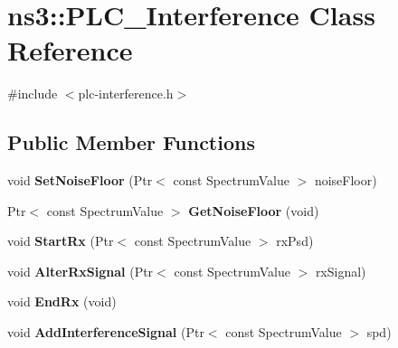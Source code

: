 \hypertarget{classns3_1_1PLC__Interference}{\section{ns3\-:\-:\-P\-L\-C\-\_\-\-Interference \-Class \-Reference}
\label{classns3_1_1PLC__Interference}
}


{\ttfamily \#include $<$plc-\/interference.\-h$>$}

\subsection*{\-Public \-Member \-Functions}
\begin{DoxyCompactItemize}
\item 
\hypertarget{classns3_1_1PLC__Interference_a627130812a35d6a0457c29886ab3aa65}{void {\bfseries \-Set\-Noise\-Floor} (\-Ptr$<$ const \-Spectrum\-Value $>$ noise\-Floor)}\label{classns3_1_1PLC__Interference_a627130812a35d6a0457c29886ab3aa65}

\item 
\hypertarget{classns3_1_1PLC__Interference_a4677a5ae77a5f51bcef95191c8a9e727}{\-Ptr$<$ const \-Spectrum\-Value $>$ {\bfseries \-Get\-Noise\-Floor} (void)}\label{classns3_1_1PLC__Interference_a4677a5ae77a5f51bcef95191c8a9e727}

\item 
\hypertarget{classns3_1_1PLC__Interference_a18b6be996768760513b0ee2e29710016}{void {\bfseries \-Start\-Rx} (\-Ptr$<$ const \-Spectrum\-Value $>$ rx\-Psd)}\label{classns3_1_1PLC__Interference_a18b6be996768760513b0ee2e29710016}

\item 
\hypertarget{classns3_1_1PLC__Interference_a4c8ea84010d1f097253693b0d9e35291}{void {\bfseries \-Alter\-Rx\-Signal} (\-Ptr$<$ const \-Spectrum\-Value $>$ rx\-Signal)}\label{classns3_1_1PLC__Interference_a4c8ea84010d1f097253693b0d9e35291}

\item 
\hypertarget{classns3_1_1PLC__Interference_a5b733c2fb32b0dc58938643a9adb9a41}{void {\bfseries \-End\-Rx} (void)}\label{classns3_1_1PLC__Interference_a5b733c2fb32b0dc58938643a9adb9a41}

\item 
\hypertarget{classns3_1_1PLC__Interference_aa9ed251d60d708accbbb88cadeaa2102}{void {\bfseries \-Add\-Interference\-Signal} (\-Ptr$<$ const \-Spectrum\-Value $>$ spd)}\label{classns3_1_1PLC__Interference_aa9ed251d60d708accbbb88cadeaa2102}


\end{DoxyCompactItemize}
